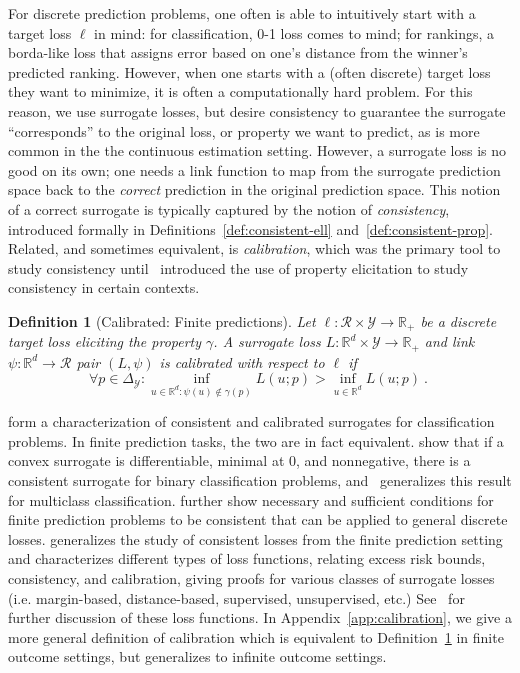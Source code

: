 \documentclass{article}
\newcommand{\reals}{\mathbb{R}}
\newcommand{\simplex}{\Delta_\Y}
\newcommand{\R}{\mathcal{R}}
\newcommand{\Y}{\mathcal{Y}}
\newtheorem{definition}{Definition}
\begin{document}
For discrete prediction problems, one often is able to intuitively start with a target loss $\ell$ in mind: for classification, 0-1 loss comes to mind; for rankings, a borda-like loss that assigns error based on one's distance from the winner's predicted ranking.
However, when one starts with a (often discrete) target loss they want to minimize, it is often a computationally hard problem.
For this reason, we use surrogate losses, but desire consistency to guarantee the surrogate ``corresponds'' to the original loss, or property we want to predict, as is more common in the the continuous estimation setting.
However, a surrogate loss is no good on its own; one needs a link function to map from the surrogate prediction space back to the \emph{correct} prediction in the original prediction space.
This notion of a correct surrogate is typically captured by the notion of \emph{consistency}, introduced formally in Definitions~\ref{def:consistent-ell} and~\ref{def:consistent-prop}.
Related, and sometimes equivalent, is \emph{calibration}, which was the primary tool to study consistency until~\cite{agarwal2015consistent} introduced the use of property elicitation to study consistency in certain contexts.

\begin{definition}[Calibrated: Finite predictions]\label{def:calibrated-finite}
	Let $\ell : \R \times \Y \to \reals_+$ be a discrete target loss eliciting the property $\gamma$.
	A surrogate loss $L : \reals^d \times \Y \to \reals_+$  and link $\psi:\reals^d \to \R$ pair $(L, \psi)$ is \emph{calibrated} with respect to $\ell$ if 
	\begin{equation}\label{eq:calibration}
	\forall p \in \simplex: \inf_{u \in \reals^d : \psi(u) \not \in \gamma(p)} L(u;p) > \inf_{u \in \reals^d} L(u;p)~.~
	\end{equation}
\end{definition}

\cite{zhang2004statistical,lin2004note,bartlett2006convexity,tewari2007consistency} form a characterization of consistent and calibrated surrogates for classification problems.
In finite prediction tasks, the two are in fact equivalent.  
\cite{bartlett2006convexity} show that if a convex surrogate is differentiable, minimal at $0$, and nonnegative, there is a consistent surrogate for binary classification problems, and~\cite{tewari2007consistency} generalizes this result for multiclass classification. 
\cite{ramaswamy2016convex} further show necessary and sufficient conditions for finite prediction problems to be consistent that can be applied to general discrete losses.
\cite{steinwart2007compare} generalizes the study of consistent losses from the finite prediction setting and characterizes different types of loss functions, relating excess risk bounds, consistency, and calibration, giving proofs for various classes of surrogate losses (i.e. margin-based, distance-based, supervised, unsupervised, etc.)
See~\cite[Chapter 2]{steinwart2008support} for further discussion of these loss functions.
In Appendix~\ref{app:calibration}, we give a more general definition of calibration which is equivalent to Definition~\ref{def:calibrated-finite} in finite outcome settings, but generalizes to infinite outcome settings.
\end{document}
